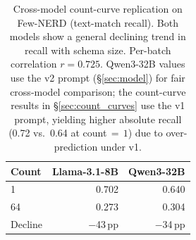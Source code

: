 \documentclass[11pt]{article}
\begin{document}
\begin{table}[h]
\centering
\small
\caption{Cross-model count-curve replication on Few-NERD (text-match recall). Both models show a general declining trend in recall with schema size. Per-batch correlation $r = 0.725$. Qwen3-32B values use the v2 prompt (\S\ref{sec:model}) for fair cross-model comparison; the count-curve results in \S\ref{sec:count_curves} use the v1 prompt, yielding higher absolute recall (0.72 vs.\ 0.64 at count${}\,=\,1$) due to over-prediction under v1.}
\label{tab:cross_model}
\begin{tabular}{lrr}
\toprule
\textbf{Count} & \textbf{Llama-3.1-8B} & \textbf{Qwen3-32B} \\
\midrule
1 & 0.702 & 0.640 \\
64 & 0.273 & 0.304 \\
\midrule
Decline & $-$43\,pp & $-$34\,pp \\
\bottomrule
\end{tabular}
\end{table}

\begin{table}[h]
\centering
\small
\caption{Cross-model BCS-controlled FewRel accuracy.  High-BCS accuracy converges to $\approx$51\% regardless of model, while low-BCS accuracy reflects model capacity differences.  The confusability gap ($\Delta$, in pp) is 77--87\% as large on Llama-3.1-8B as on Qwen3-32B.}
\label{tab:cross_model_bcs}
\end{table}
\end{document}
